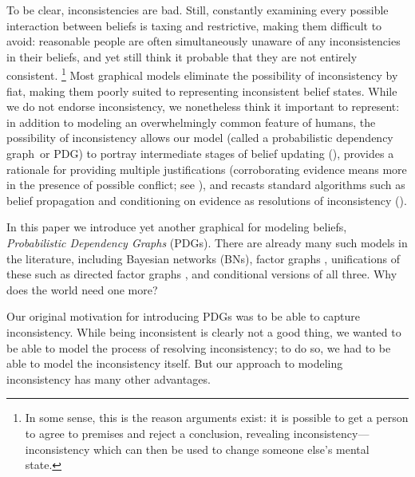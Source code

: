 \documentclass{article}
\newcommand{\modelname}{probabilistic dependency graph}
\newcommand{\MN}{PDG}
\numberwithin{equation}{section}
\begin{document}
\begin{notfocus}
{	
	To be clear, inconsistencies are bad. Still, constantly examining every possible interaction between beliefs is taxing and restrictive, making them difficult to avoid: reasonable people are often simultaneously unaware of any inconsistencies in their beliefs, and yet still think it probable that they are not entirely consistent.%
		\footnote{In some sense, this is the reason arguments exist: it is possible to get a person to agree to premises and reject a conclusion, revealing inconsistency---inconsistency which can then be used to change someone else's mental state. }		
	Most graphical models eliminate the possibility of inconsistency by fiat, 
	making them poorly suited to representing inconsistent belief states.
	While we do not endorse inconsistency, we nonetheless think it important to represent: in addition to modeling an overwhelmingly common feature of humans, the possibility of inconsistency 
	allows our model (called a \modelname\ or \MN)
	to portray intermediate stages of belief updating (), 
	provides a rationale for providing multiple justifications 
	(corroborating evidence means more in the presence of possible conflict; see ),
	and	recasts standard algorithms such as belief propagation and conditioning on evidence as resolutions of inconsistency (). }

In this paper we introduce yet another graphical for modeling beliefs,
\emph{Probabilistic Dependency Graphs} (PDGs).  
There are already many such models in the literature, including 
Bayesian networks (BNs), factor graphs \parencite{koller2009probabilistic},
unifications of 
these such as directed factor graphs \parencite{frey2012extending},
and conditional versions of all three. 
Why does the world need one more?

Our original motivation for introducing PDGs was to be able to capture
inconsistency.  
While being inconsistent is clearly not a good thing,
we wanted to be able to model the process of resolving inconsistency;
to do so, we had to be able to model the inconsistency itself.  
But our approach to modeling inconsistency has many other advantages.


\end{notfocus}
\end{document}
